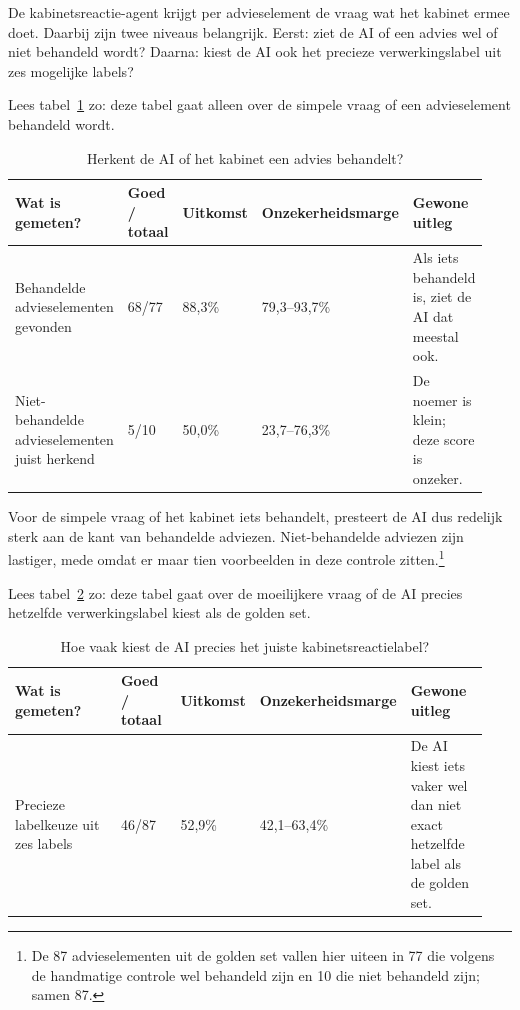 De kabinetsreactie-agent krijgt per advieselement de vraag wat het kabinet ermee doet. Daarbij zijn twee niveaus belangrijk. Eerst: ziet de AI of een advies wel of niet behandeld wordt? Daarna: kiest de AI ook het precieze verwerkingslabel uit zes mogelijke labels?

Lees tabel~\ref{tab:dv2-golden-set-kabinetsreactie-binair} zo: deze tabel gaat alleen over de simpele vraag of een advieselement behandeld wordt.

\begin{table}[htbp]
\centering
\small
\caption{Herkent de AI of het kabinet een advies behandelt?}
\label{tab:dv2-golden-set-kabinetsreactie-binair}
\begin{tabular}{p{0.30\linewidth}p{0.14\linewidth}p{0.13\linewidth}p{0.18\linewidth}p{0.19\linewidth}}
\hline
Wat is gemeten? & Goed / totaal & Uitkomst & Onzekerheidsmarge & Gewone uitleg \\
\hline
Behandelde advieselementen gevonden & 68/77 & 88,3\% & 79,3--93,7\% & Als iets behandeld is, ziet de AI dat meestal ook. \\
Niet-behandelde advieselementen juist herkend & 5/10 & 50,0\% & 23,7--76,3\% & De noemer is klein; deze score is onzeker. \\
\hline
\end{tabular}
\end{table}

Voor de simpele vraag of het kabinet iets behandelt, presteert de AI dus redelijk sterk aan de kant van behandelde adviezen. Niet-behandelde adviezen zijn lastiger, mede omdat er maar tien voorbeelden in deze controle zitten.\footnote{De 87 advieselementen uit de golden set vallen hier uiteen in 77 die volgens de handmatige controle wel behandeld zijn en 10 die niet behandeld zijn; samen 87.}

Lees tabel~\ref{tab:dv2-golden-set-kabinetsreactie-label} zo: deze tabel gaat over de moeilijkere vraag of de AI precies hetzelfde verwerkingslabel kiest als de golden set.

\begin{table}[htbp]
\centering
\small
\caption{Hoe vaak kiest de AI precies het juiste kabinetsreactielabel?}
\label{tab:dv2-golden-set-kabinetsreactie-label}
\begin{tabular}{p{0.30\linewidth}p{0.14\linewidth}p{0.13\linewidth}p{0.18\linewidth}p{0.19\linewidth}}
\hline
Wat is gemeten? & Goed / totaal & Uitkomst & Onzekerheidsmarge & Gewone uitleg \\
\hline
Precieze labelkeuze uit zes labels & 46/87 & 52,9\% & 42,1--63,4\% & De AI kiest iets vaker wel dan niet exact hetzelfde label als de golden set. \\
\hline
\end{tabular}
\end{table}

